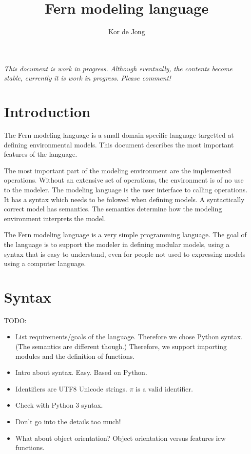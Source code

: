 \documentclass[10pt, a4paper]{article}
\begin{document}
\title{Fern modeling language}
\author{Kor de Jong}
\maketitle

\emph{This document is work in progress. Although eventually, the contents become stable, currently it is work in progress. Please comment!}

\section{Introduction}
The Fern modeling language is a small domain specific language targetted at defining environmental models. This document describes the most important features of the language.

The most important part of the modeling environment are the implemented operations. Without an extensive set of operations, the environment is of no use to the modeler. The modeling language is the user interface to calling operations. It has a syntax which needs to be folowed when defining models. A syntactically correct model has semantics. The semantics determine how the modeling environment interprets the model.

The Fern modeling language is a very simple programming language. The goal of the language is to support the modeler in defining modular models, using a syntax that is easy to understand, even for people not used to expressing models using a computer language.

\section{Syntax}
TODO:

\begin{itemize}
    \item List requirements/goals of the language. Therefore we chose Python syntax. (The semantics are different though.) Therefore, we support importing modules and the definition of functions.
    \item Intro about syntax. Easy. Based on Python.
    \item Identifiers are UTF8 Unicode strings. $\pi$ is a valid identifier.
    \item Check with Python 3 syntax.
    \item Don't go into the details too much!
    \item What about object orientation? Object orientation versus features icw functions.
\end{itemize}
\end{document}

